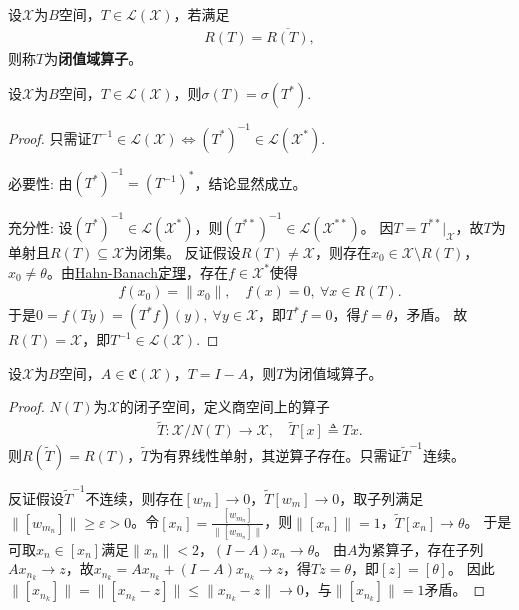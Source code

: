 \documentclass[../../main.tex]{subfiles}%
\begin{document}
\begin{definition}[闭值域算子]
设$\mathscr{X}$为$B$空间，$T\in\mathscr{L}(\mathscr{X})$，若满足
\begin{align*}
R(T)=\overline{R(T)},
\end{align*}
则称$T$为\textbf{闭值域算子}。
\end{definition}

\begin{theorem}
设$\mathscr{X}$为$B$空间，$T\in\mathscr{L}(\mathscr{X})$，则$\sigma(T)=\sigma(T^*)$.
\end{theorem}
\begin{proof}
只需证$T^{-1}\in\mathscr{L}(\mathscr{X})\iff (T^*)^{-1}\in\mathscr{L}(\mathscr{X}^*)$.

{\heiti 必要性}: 由$(T^*)^{-1}=(T^{-1})^*$，结论显然成立。

{\heiti 充分性}: 设$(T^*)^{-1}\in\mathscr{L}(\mathscr{X}^*)$，则$(T^{**})^{-1}\in\mathscr{L}(\mathscr{X}^{**})$。
因$T=T^{**}\big|_{\mathscr{X}}$，故$T$为单射且$R(T)\subseteq\mathscr{X}$为闭集。
反证假设$R(T)\neq\mathscr{X}$，则存在$x_0\in\mathscr{X}\setminus R(T)$，$x_0\neq\theta$。由\hyperref[theorem:泛函分析--(哈恩-巴拿赫)Hahn-Banach定理]{Hahn-Banach定理}，存在$f\in\mathscr{X}^*$使得
\begin{align*}
f(x_0)=\|x_0\|,\quad f(x)=0,\ \forall x\in R(T).
\end{align*}
于是$0=f(Ty)=(T^*f)(y),\ \forall y\in\mathscr{X}$，即$T^*f=0$，得$f=\theta$，矛盾。
故$R(T)=\mathscr{X}$，即$T^{-1}\in\mathscr{L}(\mathscr{X})$.
\end{proof}

\begin{theorem}\label{theorem:紧算子与闭值域算子的关系}
设$\mathscr{X}$为$B$空间，$A\in\mathfrak{C}(\mathscr{X})$，$T=I-A$，则$T$为闭值域算子。
\end{theorem}
\begin{proof}
$N(T)$为$\mathscr{X}$的闭子空间，定义商空间上的算子
\begin{align*}
\widetilde{T}:\mathscr{X}/N(T)\to\mathscr{X},\quad \widetilde{T}[x]\triangleq Tx.
\end{align*}
则$R(\widetilde{T})=R(T)$，$\widetilde{T}$为有界线性单射，其逆算子存在。只需证$\widetilde{T}^{-1}$连续。

反证假设$\widetilde{T}^{-1}$不连续，则存在$[w_m]\to0$，$\widetilde{T}[w_m]\to0$，取子列满足$\|[w_{m_n}]\|\geqslant\varepsilon>0$。令$[x_n]=\frac{[w_{m_n}]}{\|[w_{m_n}]\|}$，则$\|[x_n]\|=1$，$\widetilde{T}[x_n]\to\theta$。
于是可取$x_n\in[x_n]$满足$\|x_n\|<2$，$(I-A)x_n\to\theta$。
由$A$为紧算子，存在子列$Ax_{n_k}\to z$，故$x_{n_k}=Ax_{n_k}+(I-A)x_{n_k}\to z$，得$Tz=\theta$，即$[z]=[\theta]$。
因此$\|[x_{n_k}]\|=\|[x_{n_k}-z]\|\leqslant\|x_{n_k}-z\|\to0$，与$\|[x_{n_k}]\|=1$矛盾。
\end{proof}
\end{document}
